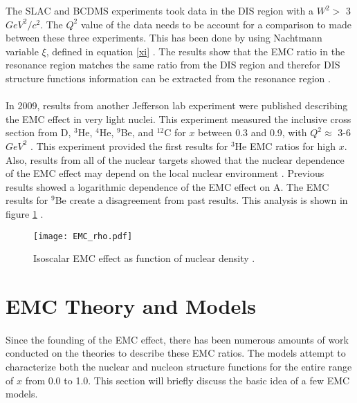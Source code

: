 The SLAC and BCDMS experiments took data in the DIS region with a $W^2 > $ 3 $GeV^2/c^2$. The $Q^2$ value of the data needs to be account for a comparison to made between these three experiments. This has been done by using Nachtmann variable $\xi$, defined in equation \ref{xi} \cite{EMC_JA}. The results show that the EMC ratio in the resonance region matches the same ratio from the DIS region and therefor DIS structure functions information can be extracted from the resonance region \cite{seelyth}. 
\paragraph{}In 2009, results from another Jefferson lab experiment were published describing the EMC effect in very light nuclei. This experiment measured the inclusive cross section from D, $^3$He, $^4$He, $^9$Be, and $^{12}$C for $x$ between 0.3 and 0.9, with $Q^2 \approx$ 3-6 $GeV^2$ \cite{seeley}.  This experiment provided the first results for $^3$He EMC ratios for high $x$.  Also, results from all of the nuclear targets showed that the nuclear dependence of the EMC effect may depend on the local nuclear environment \cite{seeley}. Previous results showed a logarithmic dependence of the EMC effect on A. The EMC results for $^9$Be create a disagreement from past results. This analysis is shown in figure \ref{EMCrho} \cite{seeley}.

\iffalse
\begin{figure}[h]
	\centering
	\texttt{[image: He3\_EMC\_seely.pdf]} 
	\caption{EMC ratio for He3, Blue points are corrected for proton excess\cite{seeley}.}
	\label{EMCHe3_Seely}
\end{figure} 
\fi

\begin{figure}[h]
	\centering
	\texttt{[image: EMC\_rho.pdf]} 
	\caption{Isoscalar EMC effect as function of nuclear density \cite{seeley}.}
	\label{EMCrho}
\end{figure} 

\section{EMC Theory and Models}
\paragraph{}Since the founding of the EMC effect, there has been numerous amounts of work conducted on the theories to describe these EMC ratios. The models attempt to characterize both the nuclear and nucleon structure functions for the entire range of $x$ from 0.0 to 1.0. This section will briefly discuss the basic idea of a few EMC models.
